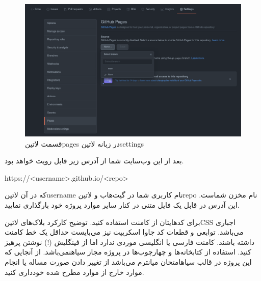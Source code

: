 \documentclass[../main.tex]{subfiles}
\begin{document}
\begin{figure}[h]
  \centering
  \includegraphics[scale=0.3]{./github-step-2}
  \caption{قسمت ‌لاتین{pages} در زبانه ‌لاتین{settings}}
\end{figure}

بعد از این وب‌سایت شما از آدرس زیر قابل رویت خواهد بود.

\begin{latin}\begin{center}
https://<username>.github.io/<repo>
\end{center}\end{latin}

که در آن ‌لاتین{username} نام کاربری شما در گیت‌هاب و ‌لاتین{repo} نام مخزن شماست. این آدرس در قابل یک فایل متنی در کنار سایر موارد پروژه خود بارگذاری نمایید.


     برای کدهایتان از کامنت استفاده کنید. توضیح کارکرد بلاک‌های ‌لاتین{CSS} اجباری می‌باشد. توابعی و قطعات کد جاوا اسکریپت نیز می‌بایست حداقل یک خط کامنت داشته باشند.
     کامنت فارسی یا انگلیسی موردی ندارد اما از فینگلیش (!) نوشتن پرهیز کنید.
     استفاده از کتابخانه‌ها و چهارچوب‌ها در پروژه مجاز ‌سیاه{نمی‌باشد}.
     از آنجایی که این پروژه در قالب ‌سیاه{امتحان میانترم} می‌باشد از تغییر دادن صورت مساله یا انجام موارد خارج از موارد مطرح شده خودداری کنید.

\end{document}
